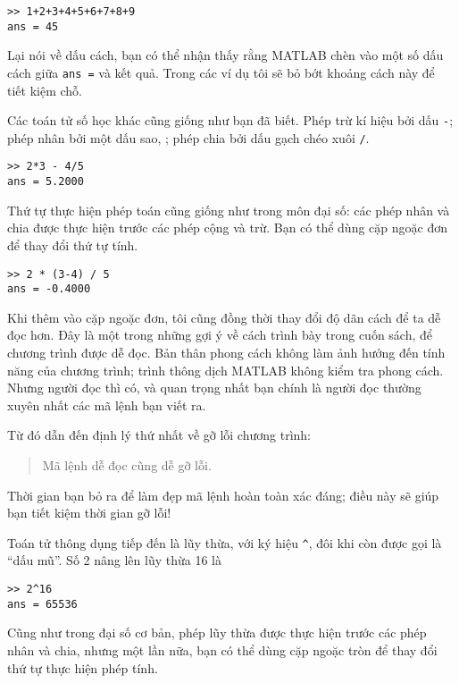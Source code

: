 \documentclass[12pt]{book}
\begin{document}
\begin{verbatim}
>> 1+2+3+4+5+6+7+8+9
ans = 45
\end{verbatim}

Lại nói về dấu cách, bạn có thể nhận thấy rằng MATLAB chèn vào một số
dấu cách giữa {\tt ans =} và kết quả. Trong các ví dụ tôi sẽ bỏ bớt khoảng
cách này để tiết kiệm chỗ.

Các toán tử số học khác cũng giống như bạn đã biết. Phép trừ kí hiệu 
bởi dấu {\tt -}; phép nhân bởi một dấu sao, {\tt *}; phép chia bởi dấu 
gạch chéo xuôi {\tt /}.

\begin{verbatim}
>> 2*3 - 4/5
ans = 5.2000
\end{verbatim}

Thứ tự thực hiện phép toán cũng giống như trong môn đại số: các phép 
nhân và chia được thực hiện trước các phép cộng và trừ. Bạn có thể dùng
cặp ngoặc đơn để thay đổi thứ tự tính.

\begin{verbatim}
>> 2 * (3-4) / 5
ans = -0.4000
\end{verbatim}

Khi thêm vào cặp ngoặc đơn, tôi cũng đồng thời thay đổi độ dãn cách
để ta dễ đọc hơn. Đây là một trong những gợi ý về cách trình bày trong
cuốn sách, để chương trình được dễ đọc. Bản thân phong cách không
làm ảnh hưởng đến tính năng của chương trình; trình thông dịch MATLAB
không kiểm tra phong cách. Nhưng người đọc thì có, và quan trọng nhất
bạn chính là người đọc thường xuyên nhất các mã lệnh bạn viết ra. 

Từ đó dẫn đến định lý thứ nhất về gỡ lỗi chương trình:

\begin{quote}
Mã lệnh dễ đọc cũng dễ gỡ lỗi.
\end{quote}

Thời gian bạn bỏ ra để làm đẹp mã lệnh hoàn toàn xác đáng; điều này sẽ giúp
bạn tiết kiệm thời gian gỡ lỗi!

Toán tử thông dụng tiếp đến là lũy thừa, với ký hiệu \verb+^+,
đôi khi còn được gọi là ``dấu mũ''. Số 2 nâng lên lũy thừa 16 là

\begin{verbatim}
>> 2^16
ans = 65536
\end{verbatim}

Cũng như trong đại số cơ bản, phép lũy thừa được thực hiện trước các phép 
nhân và chia, nhưng một lần nữa, bạn có thể dùng cặp ngoặc tròn để thay
đổi thứ tự thực hiện phép tính.
\end{document}
